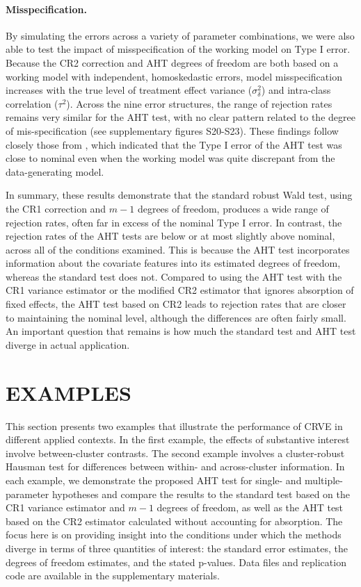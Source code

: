 \documentclass[12pt]{article}\usepackage[]{graphicx}\usepackage[]{color}
\begin{document}
\paragraph{Misspecification.} By simulating the errors across a variety of parameter combinations, we were also able to test the impact of misspecification of the working model on Type I error.
Because the CR2 correction and AHT degrees of freedom are both based on a working model with independent, homoskedastic errors, model misspecification increases with the true level of treatment effect variance ($\sigma_\delta^2$) and intra-class correlation ($\tau^2$).
Across the nine error structures, the range of rejection rates remains very similar for the AHT test, with no clear pattern related to the degree of mis-specification (see supplementary figures S20-S23). 
These findings follow closely those from , which indicated that the Type I error of the AHT test was close to nominal even when the working model was quite discrepant from the data-generating model.

In summary, these results demonstrate that the standard robust Wald test, using the CR1 correction and $m - 1$ degrees of freedom, produces a wide range of rejection rates, often far in excess of the nominal Type I error. 
In contrast, the rejection rates of the AHT tests are below or at most slightly above nominal, across all of the conditions examined. 
This is because the AHT test incorporates information about the covariate features into its estimated degrees of freedom, whereas the standard test does not.
Compared to using the AHT test with the CR1 variance estimator or the modified CR2 estimator that ignores absorption of fixed effects, the AHT test based on CR2 leads to rejection rates that are closer to maintaining the nominal level, although the differences are often fairly small. 
An important question that remains is how much the standard test and AHT test diverge in actual application.

\section{EXAMPLES}
\label{sec:examples}

This section presents two examples that illustrate the performance of CRVE in different applied contexts. 
In the first example, the effects of substantive interest involve between-cluster contrasts. 
The second example involves a cluster-robust Hausman test for differences between within- and across-cluster information. 
In each example, we demonstrate the proposed AHT test for single- and multiple-parameter hypotheses and compare the results to the standard test based on the CR1 variance estimator and $m - 1$ degrees of freedom, as well as the AHT test based on the CR2 estimator calculated without accounting for absorption. 
The focus here is on providing insight into the conditions under which the methods diverge in terms of three quantities of interest: the standard error estimates, the degrees of freedom estimates, and the stated p-values. 
Data files and replication code are available in the supplementary materials.
\end{document}
